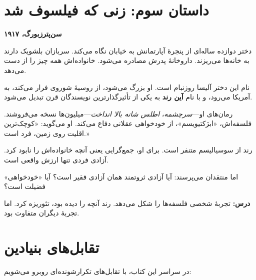 \section*{داستان سوم: زنی که فیلسوف شد}

\textbf{سن‌پترزبورگ، ۱۹۱۷}

دختر دوازده ساله‌ای از پنجرهٔ آپارتمانش به خیابان نگاه می‌کند. سربازان بلشویک دارند به خانه‌ها می‌ریزند. داروخانهٔ پدرش مصادره می‌شود. خانواده‌اش همه چیز را از دست می‌دهد.

نام این دختر آلیسا روزنبام است. او بزرگ می‌شود، از روسیهٔ شوروی فرار می‌کند، به آمریکا می‌رود، و با نام \textbf{آین رند} به یکی از تأثیرگذارترین نویسندگان قرن تبدیل می‌شود.

رمان‌های او—\textit{سرچشمه}، \textit{اطلس شانه بالا انداخت}—میلیون‌ها نسخه می‌فروشند. فلسفه‌اش، «ابژکتیویسم»، از خودخواهی عقلانی دفاع می‌کند. او می‌گوید: «کوچک‌ترین اقلیت روی زمین، فرد است.»

رند از سوسیالیسم متنفر است. برای او، جمع‌گرایی یعنی آنچه خانواده‌اش را نابود کرد. آزادی فردی تنها ارزش واقعی است.

اما منتقدان می‌پرسند: آیا آزادی ثروتمند همان آزادی فقیر است؟ آیا «خودخواهی» فضیلت است؟

\textbf{درس:} تجربهٔ شخصی فلسفه‌ها را شکل می‌دهد. رند آنچه را دیده بود، تئوریزه کرد. اما تجربهٔ دیگران متفاوت بود.

\section*{تقابل‌های بنیادین}

در سراسر این کتاب، با تقابل‌های تکرارشونده‌ای روبرو می‌شویم:

